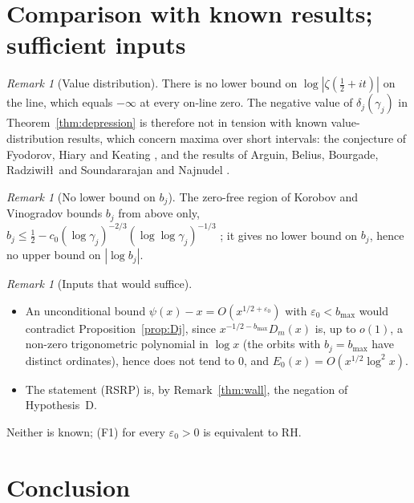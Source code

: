 \documentclass[11pt]{amsart}
\theoremstyle{definition}
\theoremstyle{remark}
\newtheorem{remark}[theorem]{Remark}
\newcommand{\RH}{\mathrm{RH}}
\newcommand{\half}{\tfrac12}
\begin{document}
\section{Comparison with known results; sufficient inputs}\label{sec:barrier}

\begin{remark}[Value distribution]\label{thm:chaos}
There is no lower bound on $\log|\zeta(\half+it)|$ on the line, which equals $-\infty$ at every
on-line zero. The negative value of $\delta_j(\gamma_j)$ in Theorem~\ref{thm:depression} is
therefore not in tension with known value-distribution results, which concern maxima over short
intervals: the conjecture of Fyodorov, Hiary and Keating \cite{FHK}, and the results of
Arguin, Belius, Bourgade, Radziwi\l\l\ and Soundararajan \cite{ABBRS} and Najnudel
\cite{Najnudel}.
\end{remark}

\begin{remark}[No lower bound on $b_j$]\label{rem:correction}
The zero-free region of Korobov and Vinogradov bounds $b_j$ from above only,
$b_j\le\half-c_0(\log\gamma_j)^{-2/3}(\log\log\gamma_j)^{-1/3}$ \cite[Ch.~6]{Ivic}; it gives no
lower bound on $b_j$, hence no upper bound on $|\log b_j|$.
\end{remark}

\begin{remark}[Inputs that would suffice]\label{thm:barrier}
\begin{itemize}
\item[\emph{(F1)}] An unconditional bound $\psi(x)-x=O(x^{1/2+\varepsilon_0})$ with
$\varepsilon_0<b_{\max}$ would contradict Proposition~\ref{prop:Dj}, since $x^{-1/2-b_{\max}}D_m(x)$ is, up to $o(1)$, a non-zero trigonometric polynomial in
$\log x$ (the orbits with $b_j=b_{\max}$ have distinct ordinates), hence does not tend to $0$,
and $E_0(x)=O(x^{1/2}\log^2x)$.
\item[\emph{(F2)}] The statement (RSRP) is, by Remark~\ref{thm:wall}, the negation of
Hypothesis~D.
\end{itemize}
Neither is known; (F1) for every $\varepsilon_0>0$ is equivalent to $\RH$.
\end{remark}

\section{Conclusion}
\end{document}
